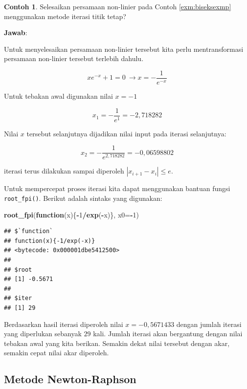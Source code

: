 \documentclass[
]{book}
\newenvironment{Shaded}{\begin{snugshade}}{\end{snugshade}}
\newcommand{\AttributeTok}[1]{\textcolor[rgb]{0.13,0.29,0.53}{#1}}
\newcommand{\ControlFlowTok}[1]{\textcolor[rgb]{0.13,0.29,0.53}{\textbf{#1}}}
\newcommand{\DecValTok}[1]{\textcolor[rgb]{0.00,0.00,0.81}{#1}}
\newcommand{\FunctionTok}[1]{\textcolor[rgb]{0.13,0.29,0.53}{\textbf{#1}}}
\newcommand{\NormalTok}[1]{#1}
\newcommand{\SpecialCharTok}[1]{\textcolor[rgb]{0.81,0.36,0.00}{\textbf{#1}}}
\theoremstyle{definition}
\theoremstyle{definition}
\newtheorem{example}{Contoh}[chapter]
\theoremstyle{definition}
\theoremstyle{definition}
\theoremstyle{remark}
\begin{document}
\begin{example}
\protect\hypertarget{exm:fixexmp}{}\label{exm:fixexmp}Selesaikan persamaan non-linier pada Contoh \ref{exm:biseksexmp} menggunakan metode iterasi titik tetap?
\end{example}

\textbf{Jawab}:

Untuk menyelesaikan persamaan non-linier tersebut kita perlu mentransformasi persamaan non-linier tersebut terlebih dahulu.

\[
xe^{-x}+1=0\ \to x=-\frac{1}{e^{-x}}
\]

Untuk tebakan awal digunakan nilai \(x=-1\)

\[
x_1 = -\frac{1}{e^{1}}=-2,718282
\]

Nilai \(x\) tersebut selanjutnya dijadikan nilai input pada iterasi selanjutnya:

\[
x_2 = -\frac{1}{e^{2,718282}}=-0,06598802
\]

iterasi terus dilakukan sampai diperoleh \(\left| x_{i+1}-x_i \right|\le e\).

Untuk mempercepat proses iterasi kita dapat menggunakan bantuan fungsi \texttt{root\_fpi()}. Berikut adalah sintaks yang digunakan:

\begin{Shaded}
\begin{Highlighting}[]
\FunctionTok{root\_fpi}\NormalTok{(}\ControlFlowTok{function}\NormalTok{(x)\{}\SpecialCharTok{{-}}\DecValTok{1}\SpecialCharTok{/}\FunctionTok{exp}\NormalTok{(}\SpecialCharTok{{-}}\NormalTok{x)\}, }\AttributeTok{x0=}\SpecialCharTok{{-}}\DecValTok{1}\NormalTok{)}
\end{Highlighting}
\end{Shaded}

\begin{verbatim}
## $`function`
## function(x){-1/exp(-x)}
## <bytecode: 0x000001dbe5412500>
## 
## $root
## [1] -0.5671
## 
## $iter
## [1] 29
\end{verbatim}

Berdasarkan hasil iterasi diperoleh nilai \(x=-0,5671433\) dengan jumlah iterasi yang diperlukan sebanyak \(29\) kali. Jumlah iterasi akan bergantung dengan nilai tebakan awal yang kita berikan. Semakin dekat nilai tersebut dengan akar, semakin cepat nilai akar diperoleh.

\hypertarget{newtonraphson}{%
\subsection{Metode Newton-Raphson}\label{newtonraphson}}
\end{document}
